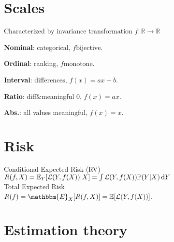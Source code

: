 


\section*{Scales}

Characterized by invariance transformation $f: \mathbb{R} \rightarrow \mathbb{R}$

\textbf{Nominal}: categorical, $f \textrm{bijective}$.

\textbf{Ordinal}: ranking, $f \textrm{monotone}$.

\textbf{Interval}: differences, $f(x) = ax + b$.

\textbf{Ratio}: diff\&meaningful 0, $f(x) = ax$.

\textbf{Abs.}: all values meaningful, $f(x) = x$. 

\section*{Risk}
Conditional Expected Risk (RV)\\
$R(f, X) = \mathbb{E}_Y[\mathcal{L}(Y,f(X))|X] = \int \mathcal{L}(Y,f(X))\mathbb{P}(Y|X)\operatorname{d\!} Y$\\
Total Expected Risk\\
$R(f) = \mathbbm{E}_{X}[R(f,X)] = \E[\mathcal{L}(Y, f(X))]$.


\section*{Estimation theory}

